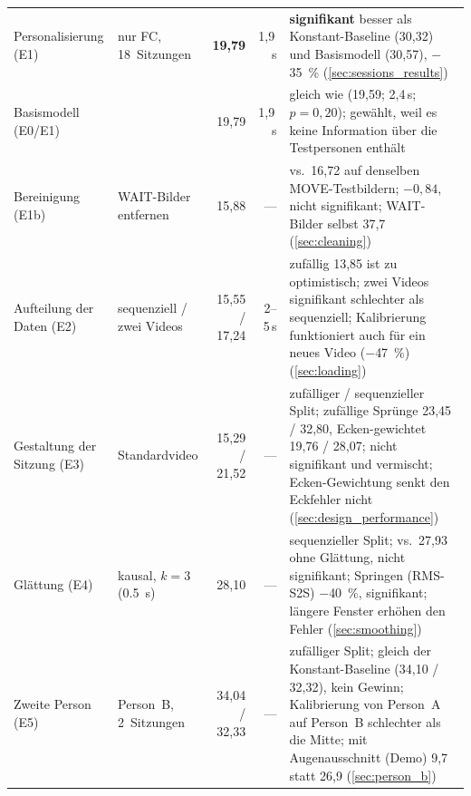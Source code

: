 \begin{table}[htbp]
\begin{tabularx}{\textwidth}{>{\raggedright\arraybackslash}p{2.3cm} >{\raggedright\arraybackslash}p{2.2cm} r r Y}
    \midrule
    Personalisierung (E1) & nur FC, 18~Sitzungen & \textbf{19,79} & 1,9\,s & \textbf{signifikant} besser als Konstant-Baseline (30,32) und Basismodell (30,57), $-$\SI{35}{\percent} (\cref{sec:sessions_results}) \\
    Basismodell (E0/E1) &  & 19,79 & 1,9\,s & gleich wie  (19,59; 2,4\,s; $p=0,20$); gewählt, weil es keine Information über die Testpersonen enthält \\
    Bereinigung (E1b) & WAIT-Bilder entfernen & 15,88 & --- & vs.\ 16,72 auf denselben MOVE-Testbildern; $-0,84$, nicht signifikant; WAIT-Bilder selbst 37,7 (\cref{sec:cleaning}) \\
    Aufteilung der Daten (E2) & sequenziell / zwei Videos & 15,55 / 17,24 & 2--5\,s & zufällig 13,85 ist zu optimistisch; zwei Videos signifikant schlechter als sequenziell; Kalibrierung funktioniert auch für ein neues Video ($-$\SI{47}{\percent}) (\cref{sec:loading}) \\
    Gestaltung der Sitzung (E3) & Standardvideo & 15,29 / 21,52 & --- & zufälliger / sequenzieller Split; zufällige Sprünge 23,45 / 32,80, Ecken-gewichtet 19,76 / 28,07; nicht signifikant und vermischt; Ecken-Gewichtung senkt den Eckfehler nicht (\cref{sec:design_performance}) \\
    Glättung (E4) & kausal, $k=3$ (\SI{0,5}{\second}) & 28,10 & --- & sequenzieller Split; vs.\ 27,93 ohne Glättung, nicht signifikant; Springen (RMS-S2S) $-$\SI{40}{\percent}, signifikant; längere Fenster erhöhen den Fehler (\cref{sec:smoothing}) \\
    Zweite Person (E5) & Person~B, 2~Sitzungen & 34,04 / 32,33 & --- & zufälliger Split; gleich der Konstant-Baseline (34,10 / 32,32), kein Gewinn; Kalibrierung von Person~A auf Person~B schlechter als die Mitte; mit Augenausschnitt (Demo) 9,7 statt 26,9 (\cref{sec:person_b}) \\
    \bottomrule
  \end{tabularx}
\end{table}
